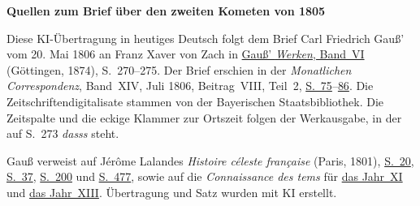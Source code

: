 \clearpage\thispagestyle{empty}
\begin{center}\textbf{Quellen zum Brief über den zweiten Kometen von 1805}\end{center}
\noindent Diese KI-Übertragung in heutiges Deutsch folgt dem Brief Carl Friedrich Gauß’ vom 20. Mai 1806 an Franz Xaver von Zach in \href{https://gdz.sub.uni-goettingen.de/id/PPN236007467}{Gauß’ \textit{Werken}, Band~VI} (Göttingen, 1874), S.~270--275. Der Brief erschien in der \textit{Monatlichen Correspondenz}, Band~XIV, Juli 1806, Beitrag~VIII, Teil~2, \href{https://www.digitale-sammlungen.de/en/view/bsb10538606?page=85}{S.~75}--\href{https://www.digitale-sammlungen.de/en/view/bsb10538606?page=96}{86}. Die Zeitschriftendigitalisate stammen von der Bayerischen Staatsbibliothek. Die Zeitspalte und die eckige Klammer zur Ortszeit folgen der Werkausgabe, in der auf S.~273 \textit{dasss} steht.
\par\medskip
Gauß verweist auf Jérôme Lalandes \textit{Histoire céleste française} (Paris, 1801), \href{https://archive.org/details/histoireclestef00lalagoog/page/n47/mode/1up}{S.~20}, \href{https://archive.org/details/histoireclestef00lalagoog/page/n64/mode/1up}{S.~37}, \href{https://archive.org/details/histoireclestef00lalagoog/page/n227/mode/1up}{S.~200} und \href{https://archive.org/details/histoireclestef00lalagoog/page/n516/mode/1up}{S.~477}, sowie auf die \textit{Connaissance des tems} für \href{https://cdt.imcce.fr/items/show/152}{das Jahr~XI} und \href{https://cdt.imcce.fr/items/show/154}{das Jahr~XIII}. Übertragung und Satz wurden mit KI erstellt.
\clearpage
